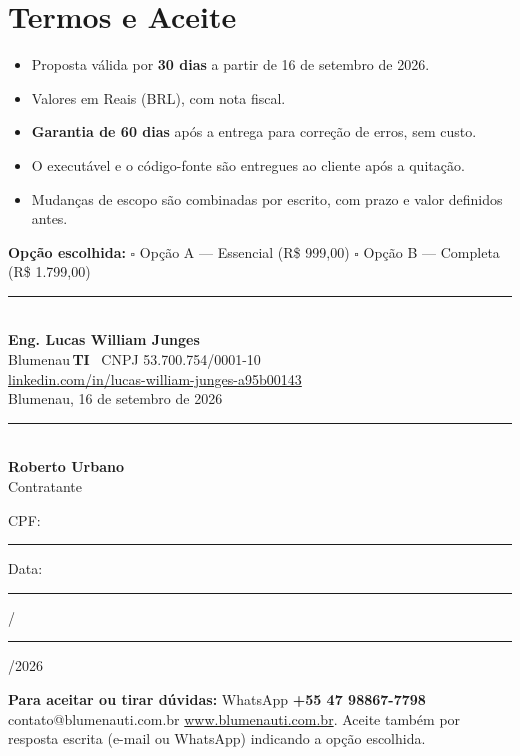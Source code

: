 \documentclass[11pt,a4paper]{article}
\newcommand{\cliente}{Roberto Urbano}
\newcommand{\autor}{Eng. Lucas William Junges}
\newcommand{\autorLinkedinURL}{https://www.linkedin.com/in/lucas-william-junges-a95b00143/}
\newcommand{\autorLinkedin}{linkedin.com/in/lucas-william-junges-a95b00143}
\newcommand{\valA}{999,00}
\newcommand{\valB}{1.799,00}
\begin{document}
\section{Termos e Aceite}

\begin{itemize}[leftmargin=1.8em, itemsep=2pt]
  \item Proposta válida por \textbf{30 dias} a partir de 16 de setembro de 2026.
  \item Valores em Reais (BRL), com nota fiscal.
  \item \textbf{Garantia de 60 dias} após a entrega para correção de erros, sem custo.
  \item O executável e o código-fonte são entregues ao cliente após a quitação.
  \item Mudanças de escopo são combinadas por escrito, com prazo e valor definidos antes.
\end{itemize}

\vspace{2mm}
\textbf{Opção escolhida:} \quad $\square$ Opção A --- Essencial (R\$ \valA) \qquad $\square$ Opção B --- Completa (R\$ \valB)

\vspace{9mm}
\noindent
\begin{minipage}[t]{0.47\textwidth}
  \centering
  \rule{\linewidth}{0.4pt}\\[2mm]
  \textbf{\autor}\\[1mm]
  {\small Blumenau\,\textcolor{golddk}{\textbf{TI}} \textbullet\ CNPJ 53.700.754/0001-10}\\[1mm]
  {\scriptsize\href{\autorLinkedinURL}{\color{navymid}\autorLinkedin}}\\[2mm]
  {\small Blumenau, 16 de setembro de 2026}
\end{minipage}
\hfill
\begin{minipage}[t]{0.47\textwidth}
  \centering
  \rule{\linewidth}{0.4pt}\\[2mm]
  \textbf{\cliente}\\[1mm]
  {\small Contratante}\\[2mm]
  {\small CPF: \rule{3.2cm}{0.3pt}\quad Data: \rule{0.6cm}{0.3pt}/\rule{0.6cm}{0.3pt}/2026}
\end{minipage}

\vspace{5mm}
\begin{tcolorbox}[greenbox]
  \small\textbf{Para aceitar ou tirar dúvidas:} WhatsApp \textbf{+55 47 98867-7798} \;\textbullet\;
  contato@blumenauti.com.br \;\textbullet\; \href{https://www.blumenauti.com.br}{www.blumenauti.com.br}.
  Aceite também por resposta escrita (e-mail ou WhatsApp) indicando a opção escolhida.
\end{tcolorbox}
\end{document}
